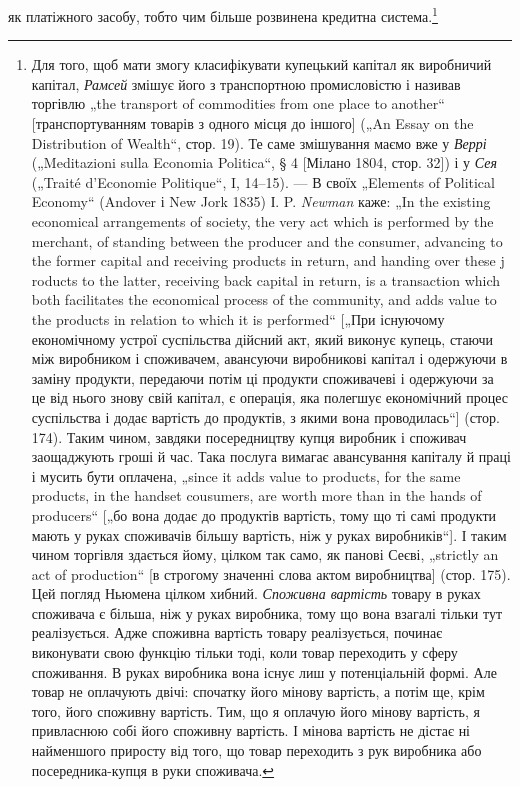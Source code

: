 як платіжного засобу, тобто чим більше розвинена кредитна система.\footnote{
Для того, щоб мати змогу класифікувати купецький капітал як виробничий
капітал, \emph{Рамсей} змішує його з транспортною промисловістю і називав
торгівлю „the transport of commodities from one place to another“ [транспортуванням
товарів з одного місця до іншого] („An Essay on the Distribution of
Wealth“, стор. 19). Те саме змішування маємо вже у \emph{Веррі} („Meditazioni sulla
Economia Politica“, § 4 [Мілано 1804, стор. 32]) і у \emph{Сея} („Traité d’Economie
Politique“, I, 14--15). — В своїх „Elements of Political Economy“ (Andover і
New Jork 1835) І. P. \emph{Newman} каже: „In the existing economical arrangements of
society, the very act which is performed by the merchant, of standing between the
producer and the consumer, advancing to the former capital and receiving products
in return, and handing over these j roducts to the latter, receiving back capital in
return, is a transaction which both facilitates the economical process of the community,
and adds value to the products in relation to which it is performed“ [„При існуючому
економічному устрої суспільства дійсний акт, який виконує купець,
стаючи між виробником і споживачем, авансуючи виробникові капітал і одержуючи
в заміну продукти, передаючи потім ці продукти споживачеві і одержуючи
за це від нього знову свій капітал, є операція, яка полегшує економічний
процес суспільства і додає вартість до продуктів, з якими вона проводилась“]
(стор. 174). Таким чином, завдяки посередництву купця виробник і споживач
заощаджують гроші й час. Така послуга вимагає авансування капіталу й праці
і мусить бути оплачена, „since it adds value to products, for the same products,
in the handset cousumers, are worth more than in the hands of producers“ [„бо вона
додає до продуктів вартість, тому що ті самі продукти мають у руках споживачів
більшу вартість, ніж у руках виробників“]. І таким чином торгівля
здається йому, цілком так само, як панові Сеєві, „strictly an act of production“
[в строгому значенні слова актом виробництва] (стор. 175). Цей погляд Ньюмена
цілком хибний. \emph{Споживна вартість} товару в руках споживача є більша, ніж у
руках виробника, тому що вона взагалі тільки тут реалізується. Адже споживна
вартість товару реалізується, починає виконувати свою функцію тільки тоді,
коли товар переходить у сферу споживання. В руках виробника вона існує лиш
у потенціальній формі. Але товар не оплачують двічі: спочатку його мінову
вартість, а потім ще, крім того, його споживну вартість. Тим, що я оплачую
його мінову вартість, я привласнюю собі його споживну вартість. І мінова вартість
не дістає ні найменшого приросту від того, що товар переходить з рук
виробника або посередника-купця в руки споживача.
}

